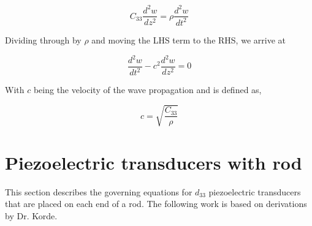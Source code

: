 \begin{equation}
C_{33}\frac{d^2w}{dz^2} = \rho \frac{d^2w}{dt^2}
\end{equation}

Dividing through by $\rho$ and moving the LHS term to the RHS, we arrive at

\begin{equation}
\frac{d^2w}{dt^2} - c^2 \frac{d^2w}{dz^2} = 0
\label{eq:waveEquationFin}
\end{equation}


With $c$ being the velocity of the wave propagation and is defined as,

\begin{equation}
c = \sqrt{\frac{C_{33}}{\rho}}
\end{equation}

\section{Piezoelectric transducers with rod}

This section describes the governing equations for $d_{33}$ piezoelectric transducers that are placed on each end of a rod. The following work is based on derivations by Dr. Korde.

